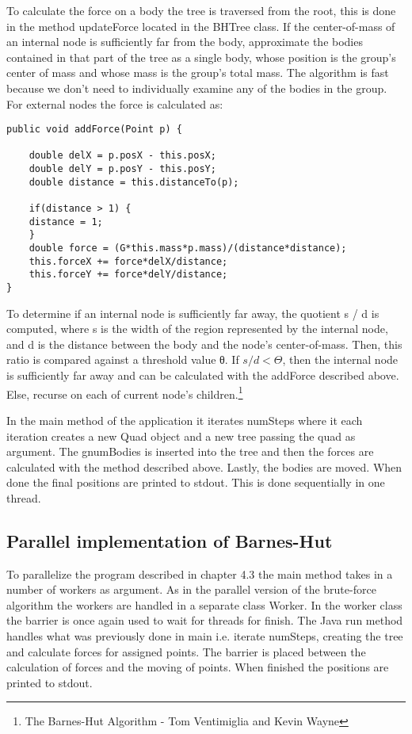 \documentclass{article}
\begin{document}
To calculate the force on a body the tree is traversed from the root, this is done in the method updateForce located in the BHTree class. If the center-of-mass of an internal node is sufficiently far from the body, approximate the bodies contained in that part of the tree as a single body, whose position is the group’s center of mass and whose mass is the group’s total mass. The algorithm is fast because we don’t need to individually examine any of the bodies in the group. For external nodes the force is calculated as: 
\begin{verbatim} 
public void addForce(Point p) {         

    double delX = p.posX - this.posX;         
    double delY = p.posY - this.posY;         
    double distance = this.distanceTo(p);                  

    if(distance > 1) {            
    distance = 1;         
    }          
    double force = (G*this.mass*p.mass)/(distance*distance);         
    this.forceX += force*delX/distance;         
    this.forceY += force*delY/distance;     
}
\end{verbatim}
To determine if an internal node is sufficiently far away, the quotient s / d is computed, where s is the width of the region represented by the internal node, and d is the distance between the body and the node’s center-of-mass. Then, this ratio is compared against a threshold value θ. If \(s / d < \Theta\), then the internal node is sufficiently far away and can be calculated with the addForce described above. Else, recurse on each of current node's children.\footnote{The Barnes-Hut Algorithm - Tom Ventimiglia and Kevin Wayne} 

In the main method of the application it iterates numSteps where it each iteration creates a new Quad object and a new tree passing the quad as argument. The gnumBodies is inserted into the tree and then the forces are calculated with the method described above. Lastly, the bodies are moved. When done the final positions are printed to stdout. This is done sequentially in one thread. 

\subsection{Parallel implementation of Barnes-Hut}

To parallelize the program described in chapter 4.3 the main method takes in a number of workers as argument. As in the parallel version of the brute-force algorithm the workers are handled in a separate class Worker. In the worker class the barrier is once again used to wait for threads for finish.  The Java run method handles what was previously done in main i.e. iterate numSteps, creating the tree and calculate forces for assigned points. The barrier is placed between the calculation of forces and the moving of points. When finished the positions are printed to stdout. 
\end{document}
